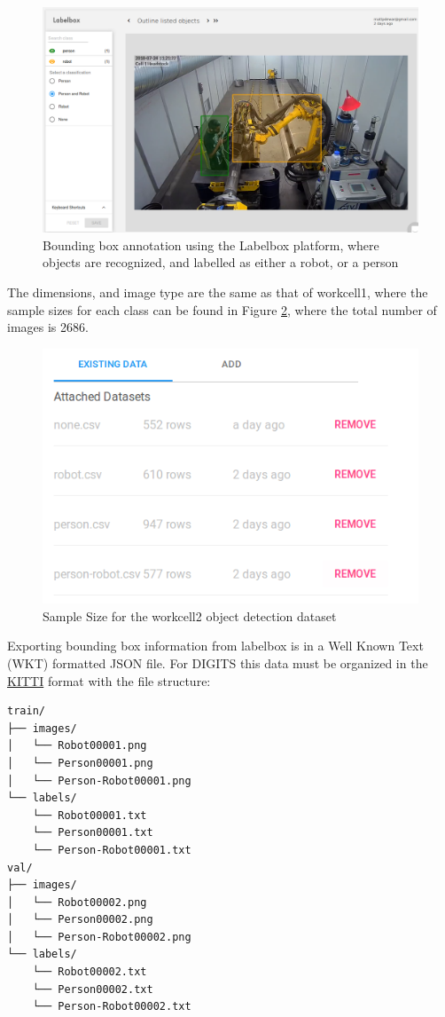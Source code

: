 \documentclass[10pt,journal,compsoc]{IEEEtran}
\begin{document}
\begin{figure}[thpb]
  \centering
  \includegraphics[width=\linewidth]{../img/Labelbox/labelbox-robot-person.png}
  \caption{Bounding box annotation using the Labelbox platform, where objects are recognized, and labelled as either a robot, or a person}
  \label{labelboxAnnot}
\end{figure}

The dimensions, and image type are the same as that of workcell1, where the sample sizes for each class can be found in Figure \ref{labelboxSamples}, where the total number of images is 2686.

\begin{figure}[thpb]
  \centering
  \includegraphics[width=\linewidth]{../img/Labelbox/labelbox_datasets.png}
  \caption{Sample Size for the workcell2 object detection dataset}
  \label{labelboxSamples}
\end{figure}

Exporting bounding box information from labelbox is in a Well Known Text (WKT) formatted JSON file. For DIGITS this data must be organized in the \href{https://devblogs.nvidia.com/deep-learning-object-detection-digits/}{KITTI} format with the file structure:
\begin{verbatim}
train/
├── images/
│   └── Robot00001.png
│   └── Person00001.png
│   └── Person-Robot00001.png
└── labels/
    └── Robot00001.txt
    └── Person00001.txt
    └── Person-Robot00001.txt
val/
├── images/
│   └── Robot00002.png
│   └── Person00002.png
│   └── Person-Robot00002.png
└── labels/
    └── Robot00002.txt
    └── Person00002.txt
    └── Person-Robot00002.txt
\end{verbatim}
\end{document}
